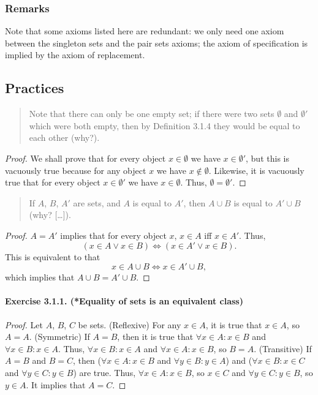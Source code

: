 \subsubsection{Remarks}
Note that some axioms listed here are redundant: we only need one axiom between the singleton sets and the pair sets axioms; the axiom of specification is implied by the axiom of replacement.

\subsection{Practices}
\begin{quote}
    Note that there can only be one empty set; if there were two sets $\emptyset$ and $\emptyset'$ which were both empty, then by Definition 3.1.4 they would be equal to each other (why?).
\end{quote}
\begin{proof}
    We shall prove that for every object $x \in \emptyset$ we have $x \in \emptyset'$, but this is vacuously true because for any object $x$ we have $x \notin \emptyset$. Likewise, it is vacuously true that for every object $x \in \emptyset'$ we have $x \in \emptyset$. Thus, $\emptyset = \emptyset'$.
\end{proof}

\begin{quote}
    If $A$, $B$, $A'$ are sets, and $A$ is equal to $A'$, then $A \cup B$ is equal to $A' \cup B$ (why? [\ldots]).
\end{quote}
\begin{proof}
    $A=A'$ implies that for every object $x$, $x\in A$ iff $x\in A'$. Thus, \[(x\in A \lor x\in B) \iff (x\in A' \lor x\in B).\] This is equivalent to that \[x\in A\cup B \iff x\in A'\cup B,\] which implies that $A\cup B = A'\cup B$.
\end{proof}

\paragraph{Exercise 3.1.1. (*Equality of sets is an equivalent class)}
\begin{proof}
    Let $A$, $B$, $C$ be sets.
    (Reflexive) For any $x \in A$, it is true that $x \in A$, so $A=A$.
    (Symmetric) If $A=B$, then it is true that $\forall x \in A : x \in B$ and $\forall x \in B : x \in A$. Thus, $\forall x \in B : x \in A$ and $\forall x \in A : x \in B$, so $B=A$.
    (Transitive) If $A=B$ and $B=C$, then ($\forall x \in A : x \in B$ and $\forall y \in B : y \in A$) and ($\forall x \in B : x \in C$ and $\forall y \in C : y \in B$) are true. Thus, $\forall x \in A : x \in B$, so $x\in C$ and $\forall y \in C : y \in B$, so $y \in A$. It implies that $A=C$.
\end{proof}


